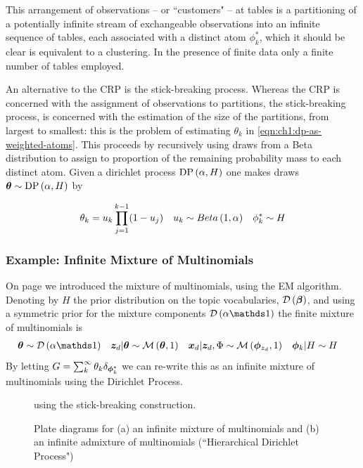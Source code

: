 This arrangement of observations -- or ``customers" --  at tables is a partitioning of a potentially infinite stream of exchangeable observations into an infinite sequence of tables, each associated with a distinct atom $\phi^*_k$, which it should be clear is equivalent to a clustering. In the presence of finite data only a finite number of tables employed.


An alternative to the CRP is the stick-breaking process\cite{Sethuraman1994}. Whereas the CRP is concerned with the assignment of observations to partitions, the stick-breaking process, is concerned with the estimation of the size of the partitions, from largest to smallest: this is the problem of estimating $\theta_k$ in \eqref{eqn:ch1:dp-as-weighted-atoms}. This proceeds by recursively using draws from a Beta distribution to assign to proportion of the remaining probability mass to each distinct atom. Given a dirichlet process $\text{DP} \left( {\alpha, H} \right)$ one makes draws $\bm \theta \sim \text{DP} \left( {\alpha, H} \right)$ by

\begin{align}
\theta_k & = u_k \prod_{j=1}^{k-1} (1 - u_j) &
u_k & \sim Beta \left( {1}, {\alpha} \right) &
\phi^*_k \sim H
\end{align}


\subsubsection*{Example: Infinite Mixture of Multinomials}
On page \pageref{sec:ch1:mom} we introduced the mixture of multinomials, using the EM algorithm. Denoting by $H$ the prior distribution on the topic vocabularies, $\mathcal{D} \left( {\bm \beta} \right)$, and using a symmetric prior for the mixture components $\dir{\alpha \one}$ the finite mixture of multinomials is
\begin{align}
\vv{\theta} & \sim \dir{\alpha \one} &
\zd|\vv{\theta} & \sim \muln{\vv{\theta}}{1} & 
\xd|\zd, \params & \sim \muln{\param_{z_{d}}}{1} & 
\param_k|H & \sim H
\end{align}
By letting $G = \sum_k^\infty \theta_k \delta_{\bm \phi^*_k}$ we can re-write this as an infinite mixture\cite{Antoniak1974} of multinomials using the Dirichlet Process.

\begin{figure}
\centering
    \subfigure[]{
        \resizebox{0.40\textwidth}{0.40\textwidth}{
            
        }
    }
    \subfigure[]{
        \resizebox{0.55\textwidth}{0.40\textwidth}{
            
        }
    }

    \caption{Plate diagrams for (a) an infinite mixture of multinomials and (b) an infinite admixture of multinomials (``Hierarchical Dirichlet Process")} using the stick-breaking construction.
\label{fig:inf-plates}
\end{figure}

